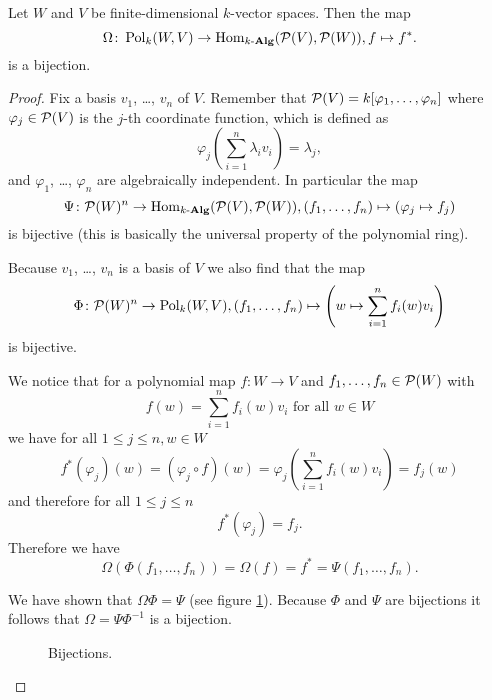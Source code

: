 \begin{prop}
 Let $W$ and $V$ be finite-dimensional $k$-vector spaces. Then the map
 \[
  \Omega \colon \operatorname{Pol}_k(W,V) \to \operatorname{Hom}_{k\text{-}\mathbf{Alg}}(\mathcal{P}(V), \mathcal{P}(W)), f \mapsto f^*.
 \]
 is a bijection.
\end{prop}
\begin{proof}
 Fix a basis $v_1$, \dots, $v_n$ of $V$. Remember that $\mathcal{P}(V) = k[\varphi_1, \dotsc, \varphi_n]$ where $\varphi_j \in \mathcal{P}(V)$ is the $j$-th coordinate function, which is defined as
 \[
  \varphi_j\left(\sum_{i=1}^n \lambda_i v_i\right) = \lambda_j,
\]
 and $\varphi_1$, \dots, $\varphi_n$ are algebraically independent. In particular the map
 \[
  \Psi \colon \mathcal{P}(W)^n \to \operatorname{Hom}_{k\text{-}\mathbf{Alg}}(\mathcal{P}(V),\mathcal{P}(W)), (f_1, \dotsc, f_n) \mapsto (\varphi_j \mapsto f_j)
 \]
 is bijective (this is basically the universal property of the polynomial ring).
 
 Because $v_1$, \dots, $v_n$ is a basis of $V$ we also find that the map
 \[
  \Phi \colon \mathcal{P}(W)^n \to \operatorname{Pol}_k(W,V), (f_1, \dotsc, f_n) \mapsto \left(w \mapsto \sum_{i=1}^n f_i(w)v_i\right)
 \]
 is bijective.
 
 We notice that for a polynomial map $f \colon W \to V$ and $f_1, \dotsc, f_n \in \mathcal{P}(W)$ with
 \[
  f(w) = \sum_{i=1}^n f_i(w) v_i \text{ for all } w \in W
 \]
 we have for all $1 \leq j \leq n, w \in W$
 \[
  f^*(\varphi_j)(w)
  = (\varphi_j \circ f)(w)
  = \varphi_j\left(\sum_{i=1}^n f_i(w) v_i\right)
  = f_j(w)
 \]
 and therefore for all $1 \leq j \leq n$
 \[
  f^*(\varphi_j) = f_j.
 \]
 Therefore we have
 \[
  \Omega(\Phi(f_1, \dotsc, f_n)) = \Omega(f) = f^* = \Psi(f_1, \dotsc, f_n).
 \]
 
 We have shown that $\Omega \Phi = \Psi$ (see figure \ref{fig: bijections}). Because $\Phi$ and $\Psi$ are bijections it follows that $\Omega = \Psi \Phi^{-1}$ is a bijection.
 
 \begin{figure}\centering
  \caption{Bijections.}
  \label{fig: bijections}
 \end{figure}
\end{proof}





